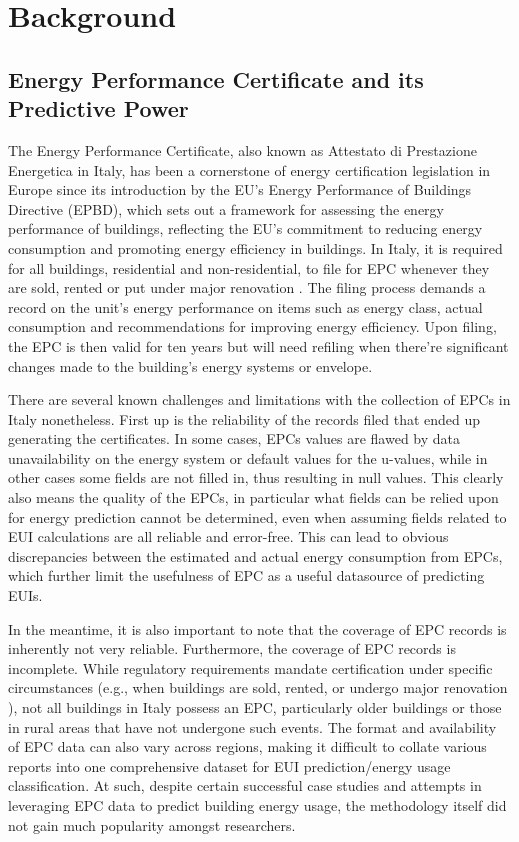 \documentclass[preprint,12pt]{elsarticle}
\begin{document}
\section{Background}
    \subsection{Energy Performance Certificate and its Predictive Power}%
    The Energy Performance Certificate, also known as Attestato di Prestazione Energetica in Italy, has been a cornerstone of energy certification legislation in Europe since its introduction by the EU's Energy Performance of Buildings Directive (EPBD), which sets out a framework for assessing the energy performance of buildings\cite{lavecchia_predicting_2024}, reflecting the EU's commitment to reducing energy consumption and promoting energy efficiency in buildings. In Italy, it is required for all buildings, residential and non-residential, to file for EPC whenever they are sold, rented or put under major renovation \cite{lavecchia_predicting_2024}. The filing process demands a record on the unit's energy performance on items such as energy class, actual consumption and recommendations for improving energy efficiency. Upon filing, the EPC is then valid for ten years but will need refiling when there're significant changes made to the building's energy systems or envelope.

    There are several known challenges and limitations with the collection of EPCs in Italy nonetheless. First up is the reliability of the records filed that ended up generating the certificates\cite{few_over-prediction_2023}. In some cases, EPCs values are flawed by data unavailability on the energy system or default values for the u-values, while in other cases some fields are not filled in, thus resulting in null values. This clearly also means the quality of the EPCs, in particular what fields can be relied upon for energy prediction cannot be determined, even when assuming fields related to EUI calculations are all reliable and error-free. This can lead to obvious discrepancies between the estimated and actual energy consumption from EPCs, which further limit the usefulness of EPC as a useful datasource of predicting EUIs. 

    In the meantime, it is also important to note that the coverage of EPC records is inherently not very reliable. 
    Furthermore, the coverage of EPC records is incomplete. While regulatory requirements mandate certification under specific circumstances (e.g., when buildings are sold, rented, or undergo major renovation ), not all buildings in Italy possess an EPC, particularly older buildings or those in rural areas that have not undergone such events.
    The format and availability of EPC data can also vary across regions, making it difficult to collate various reports into one comprehensive dataset for EUI prediction/energy usage classification. At such, despite certain successful case studies and attempts in leveraging EPC data to predict building energy usage\cite{araujo_optimizing_2024,gonzalez_caceres_usability_2018}, the methodology itself did not gain much popularity amongst researchers.
\end{document}
